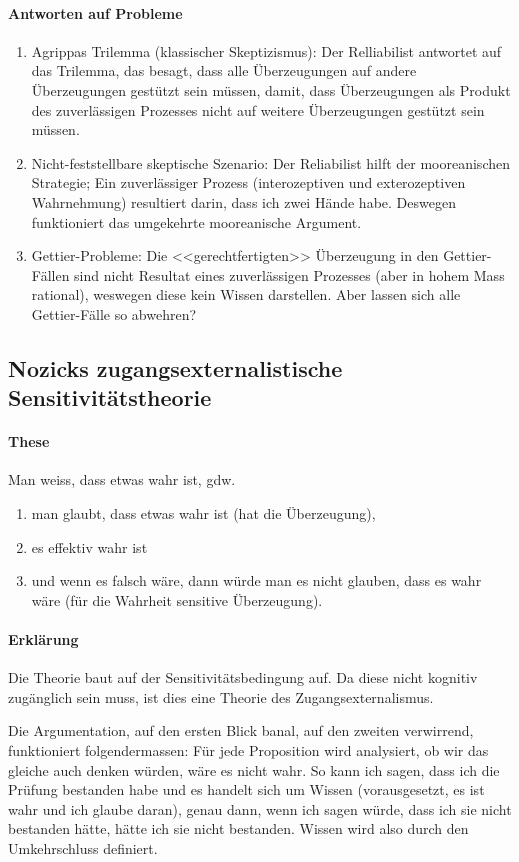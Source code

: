 \documentclass[../main.tex]{subfiles}
\begin{document}
\paragraph{Antworten auf Probleme}
\begin{enumerate}
	\item Agrippas Trilemma (klassischer Skeptizismus): Der Relliabilist antwortet auf das Trilemma, das besagt, dass alle Überzeugungen auf andere Überzeugungen gestützt sein müssen, damit, dass Überzeugungen als Produkt des zuverlässigen Prozesses nicht auf weitere Überzeugungen gestützt sein müssen. 
	\item Nicht-feststellbare skeptische Szenario: Der Reliabilist hilft der mooreanischen Strategie; Ein zuverlässiger Prozess (interozeptiven und exterozeptiven Wahrnehmung) resultiert darin, dass ich zwei Hände habe. Deswegen funktioniert das umgekehrte mooreanische Argument.
	\item Gettier-Probleme: Die <<gerechtfertigten>> Überzeugung in den Gettier-Fällen sind nicht Resultat eines zuverlässigen Prozesses (aber in hohem Mass rational), weswegen diese kein Wissen darstellen. Aber lassen sich alle Gettier-Fälle so abwehren?
\end{enumerate}

\subsection{Nozicks zugangsexternalistische Sensitivitätstheorie}
\paragraph{These} Man weiss, dass etwas wahr ist, gdw.
\begin{enumerate}
	\item man glaubt, dass etwas wahr ist (hat die Überzeugung),
	\item es effektiv wahr ist
	\item und wenn es falsch wäre, dann würde man es nicht glauben, dass es wahr wäre (für die Wahrheit sensitive Überzeugung).
\end{enumerate}
\paragraph{Erklärung} Die Theorie baut auf der Sensitivitätsbedingung auf. Da diese nicht kognitiv zugänglich sein muss, ist dies eine Theorie des Zugangsexternalismus. 

Die Argumentation, auf den ersten Blick banal, auf den zweiten verwirrend, funktioniert folgendermassen: Für jede Proposition wird analysiert, ob wir das gleiche auch denken würden, wäre es nicht wahr. So kann ich sagen, dass ich die Prüfung bestanden habe und es handelt sich um Wissen (vorausgesetzt, es ist wahr und ich glaube daran), genau dann, wenn ich sagen würde, dass ich sie nicht bestanden hätte, hätte ich sie nicht bestanden. Wissen wird also durch den Umkehrschluss definiert. 
\end{document}
